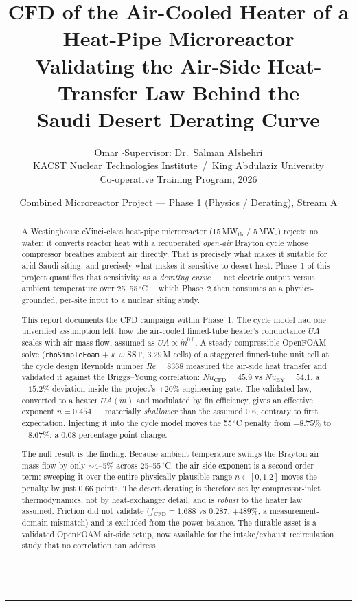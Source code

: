 \documentclass[11pt]{article}
\title{\vspace{-1.4em}\textbf{CFD of the Air-Cooled Heater of a\\Heat-Pipe Microreactor}\\[4pt]
\large Validating the Air-Side Heat-Transfer Law Behind the\\Saudi Desert Derating Curve}
\author{\normalsize Omar \quad$\cdot$\quad Supervisor: Dr.\ Salman Alshehri\\[-1pt]
\small KACST Nuclear Technologies Institute \,/\, King Abdulaziz University\\[-1pt]
\small Co-operative Training Program, 2026}
\date{\small Combined Microreactor Project --- Phase 1 (Physics / Derating), Stream A}
\newcommand{\co}{$^\circ$C}
\newcommand{\mdot}{\dot m}
\newcommand{\file}[1]{\texttt{\small #1}}
\begin{document}
\maketitle
\thispagestyle{fancy}
\vspace{-1.6em}

\noindent\rule{\linewidth}{0.4pt}
\begin{abstract}\noindent\small
A Westinghouse eVinci-class heat-pipe microreactor (15\,MW$_\mathrm{th}$ / 5\,MW$_\mathrm{e}$) rejects no
water: it converts reactor heat with a recuperated \emph{open-air} Brayton cycle whose compressor breathes
ambient air directly. That is precisely what makes it suitable for arid Saudi siting, and precisely what makes
it sensitive to desert heat. Phase~1 of this project quantifies that sensitivity as a \emph{derating curve} ---
net electric output versus ambient temperature over 25--55\,\co --- which Phase~2 then consumes as a
physics-grounded, per-site input to a nuclear siting study.

This report documents the CFD campaign within Phase~1. The cycle model had one unverified assumption left: how
the air-cooled finned-tube heater's conductance $UA$ scales with air mass flow, assumed as $UA\propto\mdot^{0.6}$.
A steady compressible OpenFOAM solve (\file{rhoSimpleFoam} + $k$--$\omega$ SST, 3.29\,M cells) of a staggered
finned-tube unit cell at the cycle design Reynolds number $Re=8368$ measured the air-side heat transfer and
validated it against the Briggs--Young correlation: $Nu_\mathrm{CFD}=45.9$ vs $Nu_\mathrm{BY}=54.1$, a
$-15.2\%$ deviation inside the project's $\pm20\%$ engineering gate. The validated law, converted to a heater
$UA(\mdot)$ and modulated by fin efficiency, gives an effective exponent $n=0.454$ --- materially
\emph{shallower} than the assumed $0.6$, contrary to first expectation. Injecting it into the cycle model moves
the 55\,\co{} penalty from $-8.75\%$ to $-8.67\%$: a $0.08$-percentage-point change.

The null result is the finding. Because ambient temperature swings the Brayton air mass flow by only
$\sim$4--5\% across 25--55\,\co, the air-side exponent is a second-order term: sweeping it over the entire
physically plausible range $n\in[0,1.2]$ moves the penalty by just $0.66$ points. The desert derating is
therefore set by compressor-inlet thermodynamics, not by heat-exchanger detail, and is \emph{robust} to the
heater law assumed. Friction did not validate ($f_\mathrm{CFD}=1.688$ vs $0.287$, $+489\%$, a
measurement-domain mismatch) and is excluded from the power balance. The durable asset is a validated OpenFOAM
air-side setup, now available for the intake/exhaust recirculation study that no correlation can address.
\end{abstract}
\noindent\rule{\linewidth}{0.4pt}
\end{document}
